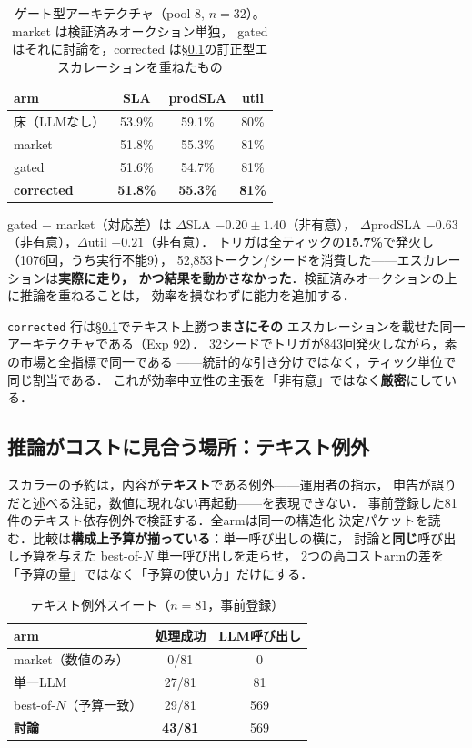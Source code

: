 \documentclass[uplatex,twocolumn,fontsize=9pt,paper=a4]{jlreq}
\begin{document}
\begin{table}[t]
\centering\small
\caption{ゲート型アーキテクチャ（pool 8, $n=32$）。market は検証済みオークション単独，
gated はそれに討論を，corrected は\S\ref{sec:text}の訂正型エスカレーションを重ねたもの}
\label{tab:gated}
\begin{tabular}{lccc}
\toprule
arm & SLA & prodSLA & util \\
\midrule
床（LLMなし） & 53.9\% & 59.1\% & 80\% \\
market & 51.8\% & 55.3\% & 81\% \\
gated & 51.6\% & 54.7\% & 81\% \\
\textbf{corrected} & \textbf{51.8\%} & \textbf{55.3\%} & \textbf{81\%} \\
\bottomrule
\end{tabular}
\end{table}

gated $-$ market（対応差）は $\Delta$SLA $-0.20\pm1.40$（非有意），
$\Delta$prodSLA $-0.63$（非有意），$\Delta$util $-0.21$（非有意）．
トリガは全ティックの\textbf{15.7\%}で発火し（1076回，うち実行不能9），
52{,}853トークン/シードを消費した——エスカレーションは\textbf{実際に走り，
かつ結果を動かさなかった}．検証済みオークションの上に推論を重ねることは，
効率を損なわずに能力を追加する．

\texttt{corrected} 行は\S\ref{sec:text}でテキスト上勝つ\textbf{まさにその}
エスカレーションを載せた同一アーキテクチャである（Exp 92）．
32シードでトリガが843回発火しながら，素の市場と全指標で同一である
——統計的な引き分けではなく，ティック単位で同じ割当である．
これが効率中立性の主張を「非有意」ではなく\textbf{厳密}にしている．

\subsection{推論がコストに見合う場所：テキスト例外}\label{sec:text}
スカラーの予約は，内容が\textbf{テキスト}である例外——運用者の指示，
申告が誤りだと述べる注記，数値に現れない再起動——を表現できない．
事前登録した81件のテキスト依存例外で検証する．全armは同一の構造化
決定パケットを読む．比較は\textbf{構成上予算が揃っている}：単一呼び出しの横に，
討論と\textbf{同じ}呼び出し予算を与えた best-of-$N$ 単一呼び出しを走らせ，
2つの高コストarmの差を「予算の量」ではなく「予算の使い方」だけにする．

\begin{table}[t]
\centering\small
\caption{テキスト例外スイート（$n=81$，事前登録）}
\label{tab:text}
\begin{tabular}{lcc}
\toprule
arm & 処理成功 & LLM呼び出し \\
\midrule
market（数値のみ） & 0/81 & 0 \\
単一LLM & 27/81 & 81 \\
best-of-$N$（予算一致） & 29/81 & 569 \\
\textbf{討論} & \textbf{43/81} & 569 \\
\bottomrule
\end{tabular}
\end{table}
\end{document}
